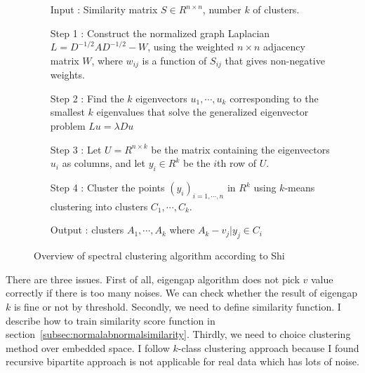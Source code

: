 \begin{figure}[ht]
\begin{mdframed}
\begin{enumerate}
\item[Input] : Similarity matrix $S \in R^{n \times n}$, number $k$ of clusters. \\
\item[Step 1] : Construct the normalized graph Laplacian $L = D^{-1/2} A D^{-1/2} - W$, using the weighted $n \times n$ adjacency matrix $W$, where $w_{ij}$ is a function of $S_{ij}$ that gives non-negative weights. \\
\item[Step 2] : Find the $k$ eigenvectors $u_1, \cdots, u_k$ corresponding to the smallest $k$ eigenvalues that solve the generalized eigenvector problem $L u = \lambda D u$ \\
\item[Step 3] : Let $U = R^{n \times k}$ be the matrix containing the eigenvectors $u_i$ as columns, and let $y_i \in R^k$ be the $i$th row of $U$.\\
\item[Step 4] : Cluster the points $(y_i)_{i=1,\cdots,n}$ in $R^k$ using $k$-means clustering into clusters $C_1,\cdots,C_k$.\\
\item[Output] : clusters $A_1, \cdots, A_k$ where $A_k - {v_j|y_j \in C_i}$
\end{enumerate}
\end{mdframed}
\caption{Overview of spectral clustering algorithm according to Shi}
\end{figure}

There are three issues. 
First of all, eigengap algorithm does not pick $v$ value correctly if there is too many noises. 
We can check whether the result of eigengap $k$ is fine or not by threshold. 
Secondly, we need to define similarity function. 
I describe how to train similarity score function in section~\ref{subsec:normalabnormalsimilarity}. 
Thirdly, we need to choice clustering method over embedded space. 
I follow $k$-class clustering approach because I found recursive bipartite approach is not applicable for real data which has lots of noise. 
